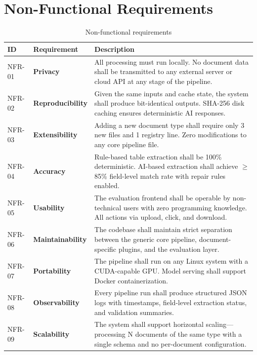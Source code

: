 \documentclass[12pt,a4paper]{report}
\begin{document}
\chapter{Non-Functional Requirements}

\begin{table}[H]
\centering\small\sffamily
\begin{tabularx}{\textwidth}{l l X}
\toprule
\textbf{ID} & \textbf{Requirement} & \textbf{Description} \\
\midrule
NFR-01 & \textbf{Privacy} & All processing must run locally. No document data shall be transmitted to any external server or cloud API at any stage of the pipeline. \\
NFR-02 & \textbf{Reproducibility} & Given the same inputs and cache state, the system shall produce bit-identical outputs. SHA-256 disk caching ensures deterministic AI responses. \\
NFR-03 & \textbf{Extensibility} & Adding a new document type shall require only 3 new files and 1 registry line. Zero modifications to any core pipeline file. \\
NFR-04 & \textbf{Accuracy} & Rule-based table extraction shall be 100\% deterministic. AI-based extraction shall achieve $\geq$85\% field-level match rate with repair rules enabled. \\
NFR-05 & \textbf{Usability} & The evaluation frontend shall be operable by non-technical users with zero programming knowledge. All actions via upload, click, and download. \\
NFR-06 & \textbf{Maintainability} & The codebase shall maintain strict separation between the generic core pipeline, document-specific plugins, and the evaluation layer. \\
NFR-07 & \textbf{Portability} & The pipeline shall run on any Linux system with a CUDA-capable GPU. Model serving shall support Docker containerization. \\
NFR-08 & \textbf{Observability} & Every pipeline run shall produce structured JSON logs with timestamps, field-level extraction status, and validation summaries. \\
NFR-09 & \textbf{Scalability} & The system shall support horizontal scaling---processing N documents of the same type with a single schema and no per-document configuration. \\
\bottomrule
\end{tabularx}
\caption{Non-functional requirements}
\end{table}
\end{document}
